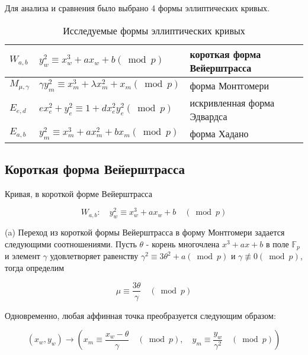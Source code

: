 
Для анализа и сравнения было выбрано 4 формы эллиптических кривых.

\begin{table}[h]
  \centering
  \begin{tabular}{|l|l|l|}
  \hline
  $W_{a, b}$ & $y_{w}^{2} \equiv x_{w}^{3}+a x_{w}+b(\bmod  p)$ & короткая форма Вейерштрасса \\
  \hline
  $M_{\mu, \gamma}$ & $\gamma y_{m}^{2} \equiv x_{m}^{3}+\lambda x_{m}^{2}+x_{m}(\bmod  p)$ & форма Монтгомери \\
  \hline
  $E_{e, d}$ & $e x_{e}^{2}+y_{e}^{2} \equiv 1+d x_{e}^{2} y_{e}^{2}(\bmod  p)$ & искривленная форма Эдвардса \\
  \hline
  $E_{a, b}$ & $ y_{m}^{2} \equiv x_{m}^{3}+a x_{m}^{2}+b x_{m}(\bmod  p)$ & форма Хадано \\
  \hline
  \end{tabular}
  \caption{Исследуемые формы эллиптических кривых}
\end{table}


\subsection{Короткая форма Вейерштрасса}

Кривая, в короткой форме Вейерштрасса~\cite{lang-elliptic}

$$
W_{a, b}: \quad y_{w}^{2} \equiv x_{w}^{3}+a x_{w}+b \quad(\bmod p)
$$

(a) Переход из короткой формы Вейерштрасса в форму Монтгомери задается следующими соотношениями. Пусть $\theta$ - корень многочлена $x^{3}+a x+b$ в поле $\mathbb{F}_{p}$ и элемент $\gamma$ удовлетворяет равенству $\gamma^{2} \equiv 3 \theta^{2}+a(\bmod p)$ и $\gamma \not \equiv 0(\bmod p)$, тогда определим

$$
\mu \equiv \frac{3 \theta}{\gamma} \quad(\bmod p)
$$

Одновременно, любая аффинная точка преобразуется следующим образом:

$$
\left(x_{w}, y_{w}\right) \rightarrow\left(x_{m} \equiv \frac{x_{w}-\theta}{\gamma} \quad(\bmod p), \quad y_{m} \equiv \frac{y_{w}}{\gamma^{2}} \quad(\bmod p)\right)
$$

